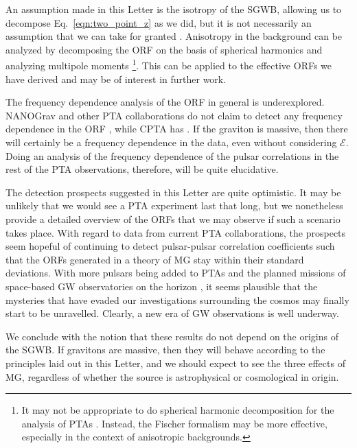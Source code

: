 \documentclass[prd,twocolumn,aps,psfig,nofootinbib,nobibnotes,superscriptaddress,preprintnumbers,times]{revtex4-2}
\begin{document}
An assumption made in this Letter is the isotropy of the SGWB, allowing us to decompose Eq.~\ref{eqn:two_point_z} as we did, but it is not necessarily an assumption that we can take for granted \cite{Depta:2024ykq, Bravo:2025csu, Cusin:2025xle, Kuwahara:2024jiz, Li:2024lvt}. Anisotropy in the background can be analyzed by decomposing the ORF on the basis of spherical harmonics and analyzing multipole moments \cite{Allen:2024bnk, Gair:2014rwa}\footnote{It may not be appropriate to do spherical harmonic decomposition for the analysis of PTAs \cite{Ali-Haimoud:2020ozu}. Instead, the Fischer formalism may be more effective, especially in the context of anisotropic backgrounds.}.  
This can be applied to the effective ORFs we have derived and may be of interest in further work. 
%

The frequency dependence analysis of the ORF in general is underexplored. NANOGrav and other PTA collaborations do not claim to detect any frequency dependence in the ORF \cite{Agazie:2023,EPTA:2023sfo,EPTA:2023akd,EPTA:2023fyk, Zic:2023gta,Reardon:2023gzh} , while CPTA has \cite{Xu:2023wog}. If the graviton is massive, then there will certainly be a frequency dependence in the data, even without considering $\mathcal{E}$. Doing an analysis of the frequency dependence of the pulsar correlations in the rest of the PTA observations, therefore, will be quite elucidative. 

The detection prospects suggested in this Letter are quite optimistic. It may be unlikely that we would see a PTA experiment last that long, but we nonetheless provide a detailed overview of the ORFs that we may observe if such a scenario takes place. With regard to data from current PTA collaborations, the prospects seem hopeful of continuing to detect pulsar-pulsar correlation coefficients such that the ORFs generated in a theory of MG stay within their standard deviations. With more pulsars being added to PTAs and the planned missions of space-based GW observatories on the horizon \cite{LISA:2017, TianQin:2015yph, Hu:2017mde}, it seems plausible that the mysteries that have evaded our investigations surrounding the cosmos may finally start to be unravelled. Clearly, a new era of GW observations is well underway. 

We conclude with the notion that these results do not depend on the origins of the SGWB. If gravitons are massive, then they will behave according to the principles laid out in this Letter, and we should expect to see the three effects of MG, regardless of whether the source is astrophysical or cosmological in origin.
\end{document}
